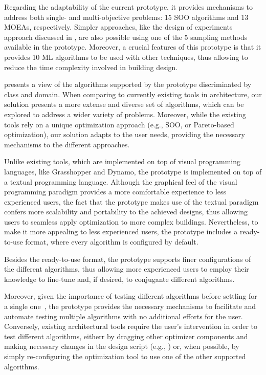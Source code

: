 Regarding the adaptability of the current prototype, it provides mechanisms to address both single- and multi-objective problems: 15 \ac{SOO} algorithms and 13 \acp{MOEA}, respectively. Simpler approaches, like the design of experiments approach discussed in , are also possible using one of the 5 sampling methods available in the prototype. Moreover, a crucial features of this prototype is that it provides 10 \ac{ML} algorithms to be used with other techniques, thus allowing to reduce the time complexity involved in building design. 


 presents a view of the algorithms supported by the prototype discriminated by class and domain. When comparing to currently existing tools in architecture, our solution presents a more extense and diverse set of algorithms, which can be explored to address a wider variety of problems. Moreover, while the existing tools rely on a unique optimization approach (e.g., \ac{SOO}, or Pareto-based optimization), our solution adapts to the user needs, providing the necessary mechanisms to the different approaches.

Unlike existing tools, which are implemented on top of visual programming languages, like Grasshopper and Dynamo, the prototype is implemented on top of a textual programming language. Although the graphical feel of the visual programming paradigm provides a more comfortable experience to less experienced users, the fact that the prototype makes use of the textual paradigm confers more scalability and portability to the achieved designs, thus allowing users to seamless apply optimization to more complex buildings. Nevertheless, to make it more appealing to less experienced users, the prototype includes a ready-to-use format, where every algorithm is configured by default.  

Besides the ready-to-use format, the prototype supports finer configurations of the different algorithms, thus allowing more experienced users to employ their knowledge to fine-tune and, if desired, to conjugante different algorithms. 

Moreover, given the importance of testing different algorithms before settling for a single one~\cite{Wortmann2016BBO}, the prototype provides the necessary mechanisms to facilitate and automate testing multiple algorithms with no additional efforts for the user. Conversely, existing architectural tools require the user's intervention in order to test different algorithms, eitherr by dragging other optimizer components and making necessary changes in the design script (e.g., ) or, when possible, by simply re-configuring the optimization tool to use one of the other supported algorithms. 

